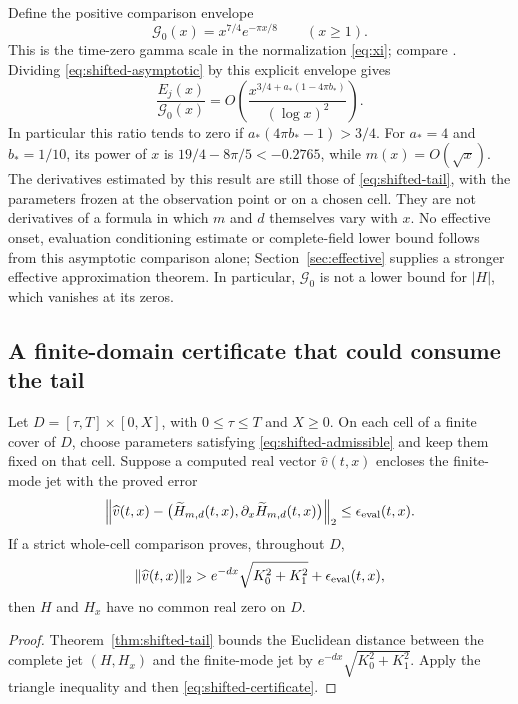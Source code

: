 Define the positive comparison envelope
\begin{equation}\label{eq:shifted-envelope}
 \mathcal G_0(x)=x^{7/4}e^{-\pi x/8}\qquad(x\ge1).
\end{equation}
This is the time-zero gamma scale in the normalization
\eqref{eq:xi}; compare \cite{Polymath}. Dividing
\eqref{eq:shifted-asymptotic} by this explicit envelope gives
\[
 \frac{E_j(x)}{\mathcal G_0(x)}
 =O\!\left(\frac{x^{3/4+a_*(1-4\pi b_*)}}{(\log x)^2}\right).
\]
In particular this ratio tends to zero if
$a_*(4\pi b_*-1)>3/4$. For $a_*=4$ and $b_*=1/10$, its power of $x$
is $19/4-8\pi/5<-0.2765$, while $m(x)=O(\sqrt x)$.
The derivatives estimated by this result are still those of
\eqref{eq:shifted-tail}, with the parameters frozen at the observation
point or on a chosen cell. They are not derivatives of a formula in
which $m$ and $d$ themselves vary with $x$. No effective onset, evaluation
conditioning estimate or complete-field lower bound follows from this
asymptotic comparison alone; Section~\ref{sec:effective} supplies a
stronger effective approximation theorem. In particular, $\mathcal G_0$ is not a lower
bound for $|H|$, which vanishes at its zeros.

\subsection{A finite-domain certificate that could consume the tail}

\begin{proposition}\label{prop:shifted-certificate}
Let $D=[\tau,T]\times[0,X]$, with $0\le\tau\le T$ and $X\ge0$.
On each cell of a finite cover of $D$, choose parameters satisfying
\eqref{eq:shifted-admissible} and keep them fixed on that cell. Suppose
a computed real vector $\widehat v(t,x)$ encloses the finite-mode jet
with the proved error
\[
 \left\|\widehat v(t,x)-
 \bigl(\widetilde H_{m,d}(t,x),
       \partial_x\widetilde H_{m,d}(t,x)\bigr)\right\|_2
 \le\epsilon_{\rm eval}(t,x).
\]
If a strict whole-cell comparison proves, throughout $D$,
\begin{equation}\label{eq:shifted-certificate}
 \|\widehat v(t,x)\|_2>
 e^{-dx}\sqrt{K_0^2+K_1^2}+\epsilon_{\rm eval}(t,x),
\end{equation}
then $H$ and $H_x$ have no common real zero on $D$.
\end{proposition}
\begin{proof}
Theorem~\ref{thm:shifted-tail} bounds the Euclidean distance between
the complete jet $(H,H_x)$ and the finite-mode jet by
$e^{-dx}\sqrt{K_0^2+K_1^2}$. Apply the triangle inequality and then
\eqref{eq:shifted-certificate}.
\end{proof}

